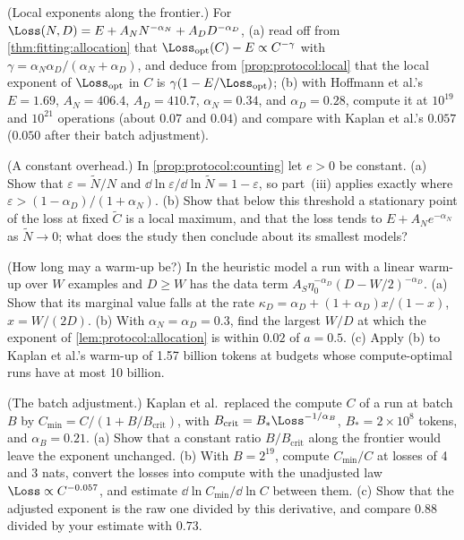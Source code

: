 \begin{refsection}
\begin{exercises}
\item \consolidation (Local exponents along the frontier.) For $\Loss(N,D)=E+A_NN^{-\alpha_N}+A_DD^{-\alpha_D}$, (a) read off from \cref{thm:fitting:allocation} that $\Loss_{\protocolopt}(C)-E\propto C^{-\gamma}$ with $\gamma=\alpha_N\alpha_D/(\alpha_N+\alpha_D)$, and deduce from \cref{prop:protocol:local} that the local exponent of $\Loss_{\protocolopt}$ in $C$ is $\gamma(1-E/\Loss_{\protocolopt})$; (b) with Hoffmann et al.'s $E=1.69$, $A_N=406.4$, $A_D=410.7$, $\alpha_N=0.34$, and $\alpha_D=0.28$, compute it at $10^{19}$ and $10^{21}$ operations (about $0.07$ and $0.04$) and compare with Kaplan et al.'s $0.057$ ($0.050$ after their batch adjustment).\label{ex:protocol:frontier}

\item \consolidation (A constant overhead.) In \cref{prop:protocol:counting} let $e>0$ be constant. (a) Show that $\varepsilon=\tilde N/N$ and $\dd\ln\varepsilon/\dd\ln\tilde N=1-\varepsilon$, so part~(iii) applies exactly where $\varepsilon>(1-\alpha_D)/(1+\alpha_N)$. (b) Show that below this threshold a stationary point of the loss at fixed $\tilde C$ is a local maximum, and that the loss tends to $E+A_Ne^{-\alpha_N}$ as $\tilde N\to0$; what does the study then conclude about its smallest models?\label{ex:protocol:fixed}

\item \consolidation (How long may a warm-up be?) In the heuristic model a run with a linear warm-up over $W$ examples and $D\ge W$ has the data term $A_S\eta_0^{-\alpha_D}(D-W/2)^{-\alpha_D}$. (a) Show that its marginal value falls at the rate $\kappa_D=\alpha_D+(1+\alpha_D)x/(1-x)$, $x=W/(2D)$. (b) With $\alpha_N=\alpha_D=0.3$, find the largest $W/D$ at which the exponent of \cref{lem:protocol:allocation} is within $0.02$ of $a=0.5$. (c) Apply (b) to Kaplan et al.'s warm-up of 1.57 billion tokens at budgets whose compute-optimal runs have at most 10 billion. \label{ex:protocol:warmup}

\item \consolidation (The batch adjustment.) Kaplan et al.\ replaced the compute $C$ of a run at batch $B$ by $C_{\min}=C/(1+B/B_{\mathrm{crit}})$, with $B_{\mathrm{crit}}=B_*\Loss^{-1/\alpha_B}$, $B_*=2\times10^8$ tokens, and $\alpha_B=0.21$. (a) Show that a constant ratio $B/B_{\mathrm{crit}}$ along the frontier would leave the exponent unchanged. (b) With $B=2^{19}$, compute $C_{\min}/C$ at losses of 4 and 3 nats, convert the losses into compute with the unadjusted law $\Loss\propto C^{-0.057}$, and estimate $\dd\ln C_{\min}/\dd\ln C$ between them. (c) Show that the adjusted exponent is the raw one divided by this derivative, and compare $0.88$ divided by your estimate with $0.73$.\label{ex:protocol:batch}


\end{exercises}
\end{refsection}
